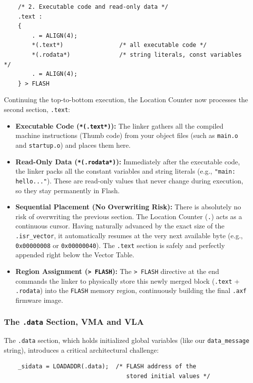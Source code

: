 \begin{lstlisting}
    /* 2. Executable code and read-only data */
    .text :
    {
        . = ALIGN(4);
        *(.text*)                /* all executable code */
        *(.rodata*)              /* string literals, const variables */
        . = ALIGN(4);
    } > FLASH
\end{lstlisting}

Continuing the top-to-bottom execution, the Location Counter now processes the second section, \texttt{.text}:

\begin{itemize}
    \item \textbf{Executable Code (\texttt{*(.text*)}):} The linker gathers all the compiled machine instructions (Thumb code) from your object files (such as \texttt{main.o} and \texttt{startup.o}) and places them here.
    \item \textbf{Read-Only Data (\texttt{*(.rodata*)}):} Immediately after the executable code, the linker packs all the constant variables and string literals (e.g., \texttt{"main: hello..."}). These are read-only values that never change during execution, so they stay permanently in Flash.
    \item \textbf{Sequential Placement (No Overwriting Risk):} There is absolutely no risk of overwriting the previous section. The Location Counter (\texttt{.}) acts as a continuous cursor. Having naturally advanced by the exact size of the \texttt{.isr\_vector}, it automatically resumes at the very next available byte (e.g., \texttt{0x00000008} or \texttt{0x00000040}). The \texttt{.text} section is safely and perfectly appended right below the Vector Table.
    \item \textbf{Region Assignment (\texttt{> FLASH}):} The \texttt{> FLASH} directive at the end commands the linker to physically store this newly merged block (\texttt{.text} + \texttt{.rodata}) into the \texttt{FLASH} memory region, continuously building the final \texttt{.axf} firmware image.
\end{itemize}

\subsubsection{The \texttt{.data} Section, VMA and VLA}
The \texttt{.data} section, which holds initialized global variables (like our \texttt{data\_message} string), introduces a critical architectural challenge:

\begin{lstlisting}
    _sidata = LOADADDR(.data);  /* FLASH address of the 
                                   stored initial values */
\end{lstlisting}

